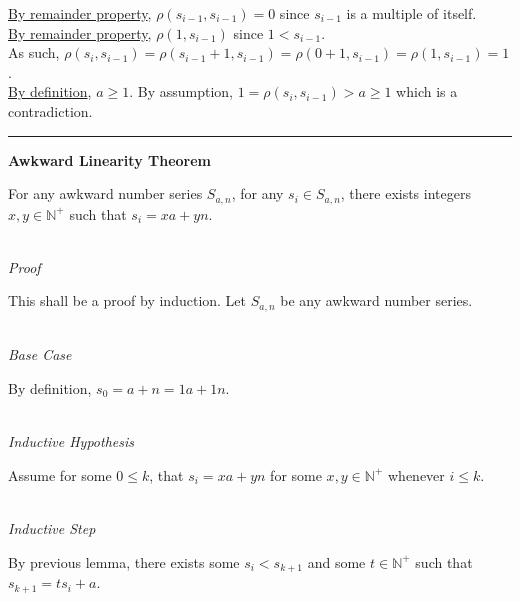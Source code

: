 \documentclass[a4paper,12pt]{article}
\begin{document}
\noindent \hyperlink{remainder_properties}{By remainder property}, $\rho(s_{i - 1}, s_{i - 1}) = 0$ since $s_{i - 1}$ is a multiple of itself.\\

\noindent \hyperlink{remainder_properties}{By remainder property}, $\rho(1, s_{i - 1})$ since $1 < s_{i - 1}$.\\

\noindent As such, $\rho(s_i, s_{i - 1}) = \rho(s_{i - 1} + 1, s_{i - 1}) = \rho(0 + 1, s_{i - 1}) = \rho(1, s_{i - 1}) = 1$.\\

\noindent \hyperlink{definition:awkward_number_series}{By definition}, $a \geq 1$. By assumption, $1 = \rho(s_i, s_{i - 1}) > a \geq 1$ which is a contradiction.


\begin{center}
\noindent\rule{8cm}{0.4pt}
\end{center}









\label{theorem:awkward_linearity}
\hypertarget{theorem:awkward_linearity}{}
\begin{tcolorbox}
\textbf{Awkward Linearity Theorem}

For any awkward number series $S_{a,n}$, for any $s_i \in S_{a,n}$, there exists integers $x, y \in \mathbb{N}^+$ such that $s_i = xa + yn$.

\end{tcolorbox}

\noindent \\
\textit{Proof}

\noindent This shall be a proof by induction. Let $S_{a,n}$ be any awkward number series.


\noindent \\
\textit{Base Case}

\noindent By definition, $s_0 = a + n = 1a + 1n$.


\noindent \\
\textit{Inductive Hypothesis}

\noindent Assume for some $0 \leq k$, that $s_i = xa + yn$ for some $x, y \in \mathbb{N}^+$ whenever $i \leq k$.


\noindent \\
\textit{Inductive Step}

\noindent By previous lemma, there exists some $s_i < s_{k+1}$ and some $t \in \mathbb{N}^+$ such that $s_{k+1} = ts_i + a$.\\
\end{document}
